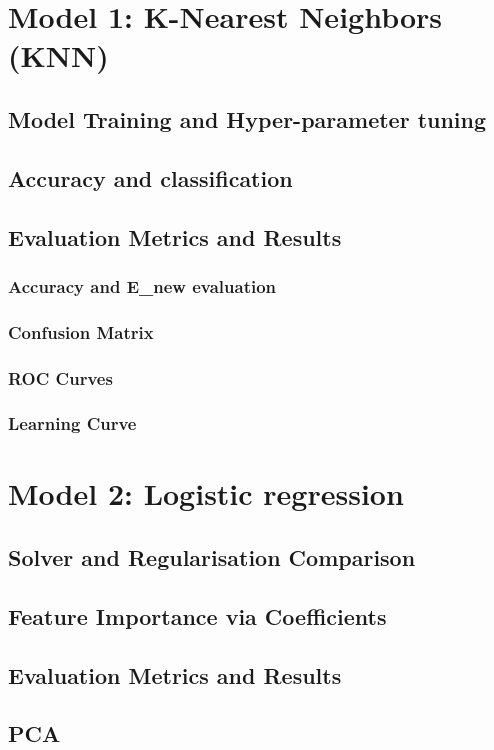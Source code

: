 \documentclass[12pt]{article}
\begin{document}
\section{Model 1: K-Nearest Neighbors (KNN)}
\subsection{Model Training and Hyper-parameter tuning}
\subsection{Accuracy and classification}
\subsection{Evaluation Metrics and Results}
\subsubsection{Accuracy and E_{new} evaluation}
\subsubsection{Confusion Matrix}
\subsubsection{ROC Curves}
\subsubsection{Learning Curve}

\section{Model 2: Logistic regression}
\subsection{Solver and Regularisation Comparison}
\subsection{Feature Importance via Coefficients}
\subsection{Evaluation Metrics and Results}
\subsection{PCA}
\end{document}
